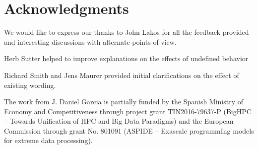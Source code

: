 \section*{Acknowledgments}

We would like to express our thanks to John Lakos for all the feedback provided
and interesting discussions with alternate points of view.

Herb Sutter helped to improve explanations on the effects of undefined behavior

Richard Smith and Jens Maurer provided initial clarifications on the effect of
existing wording.

The work from J. Daniel Garcia is partially funded by
the Spanish Ministry of Economy and Competitiveness through project grant
TIN2016-79637-P (BigHPC -- Towards Unification of HPC and Big Data Paradigms)
and the European Commission through grant
No. 801091 (ASPIDE -- Exascale programmIng models for extreme data processing).


